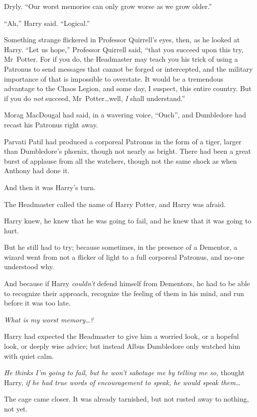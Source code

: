 Dryly. “Our worst memories can only grow worse as we grow older.”

“Ah,” Harry said. “Logical.”

Something strange flickered in Professor Quirrell’s eyes, then, as he looked at Harry. “Let us hope,” Professor Quirrell said, “that you succeed upon this try, Mr~Potter. For if you do, the Headmaster may teach you his trick of using a Patronus to send messages that cannot be forged or intercepted, and the military importance of that is impossible to overstate. It would be a tremendous advantage to the Chaos Legion, and some day, I suspect, this entire country. But if you do \emph{not} succeed, Mr~Potter…well, \emph{I} shall understand.”

\later

Morag MacDougal had said, in a wavering voice, “Ouch”, and Dumbledore had recast his Patronus right away.

Parvati Patil had produced a corporeal Patronus in the form of a tiger, larger than Dumbledore’s phœnix, though not nearly as bright. There had been a great burst of applause from all the watchers, though not the same shock as when Anthony had done it.

And then it was Harry’s turn.

The Headmaster called the name of Harry Potter, and Harry was afraid.

Harry knew, he knew that he was going to fail, and he knew that it was going to hurt.

But he still had to try; because sometimes, in the presence of a Dementor, a wizard went from not a flicker of light to a full corporeal Patronus, and no-one understood why.

And because if Harry \emph{couldn’t} defend himself from Dementors, he had to be able to recognize their approach, recognize the feeling of them in his mind, and run before it was too late.

\emph{What is my worst memory…?}

Harry had expected the Headmaster to give him a worried look, or a hopeful look, or deeply wise advice; but instead Albus Dumbledore only watched him with quiet calm.

\emph{He thinks I’m going to fail, but he won’t sabotage me by telling me so,} thought Harry, \emph{if he had true words of encouragement to speak, he would speak them…}

The cage came closer. It was already tarnished, but not rusted away to nothing, not yet.

